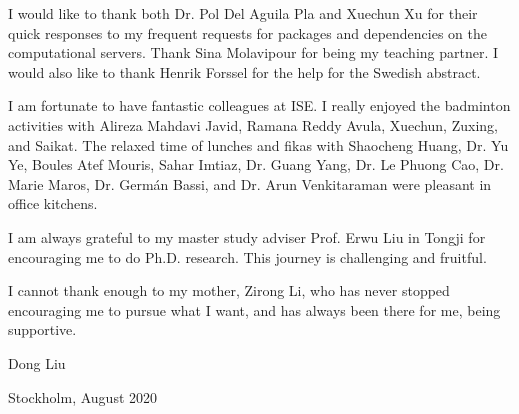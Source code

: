 I would like to thank both Dr. Pol Del Aguila Pla and Xuechun Xu for their quick responses to my frequent requests for packages and dependencies on the computational servers. Thank Sina Molavipour for being my teaching partner. I would also like to thank Henrik Forssel for the help for the Swedish abstract.


I am fortunate to have fantastic colleagues at ISE. I really enjoyed the badminton activities with Alireza Mahdavi Javid, Ramana Reddy Avula, Xuechun, Zuxing, and Saikat. The relaxed time of lunches and fikas with Shaocheng Huang, Dr. Yu Ye, Boules Atef Mouris, Sahar Imtiaz, Dr. Guang Yang, Dr. Le Phuong Cao, Dr. Marie Maros, Dr. Germ\'{a}n Bassi, and Dr. Arun Venkitaraman were pleasant in office kitchens.

I am always grateful to my master study adviser Prof. Erwu Liu in Tongji for encouraging me to do Ph.D. research. This journey is challenging and fruitful.

I cannot thank enough to my mother, Zirong Li, who has never stopped encouraging me to pursue what I want, and has always been there for me, being supportive. \newline
\newline


\hfill
Dong Liu

\hfill
Stockholm, August 2020






